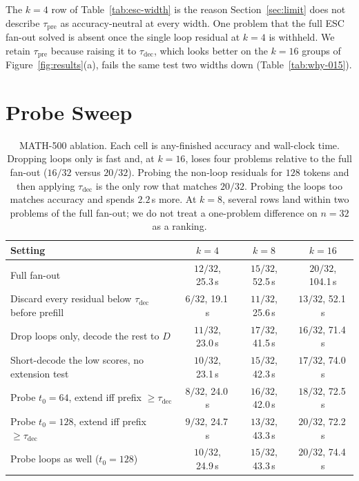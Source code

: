 The $k{=}4$ row of Table~\ref{tab:esc-width} is the reason Section~\ref{sec:limit} does not describe $\tau_{\mathrm{pre}}$ as accuracy-neutral at every width.
One problem that the full ESC fan-out solved is absent once the single loop residual at $k{=}4$ is withheld.
We retain $\tau_{\mathrm{pre}}$ because raising it to $\tau_{\mathrm{dec}}$, which looks better on the $k{=}16$ groups of Figure~\ref{fig:results}(a), fails the same test two widths down (Table~\ref{tab:why-015}).

\section{Probe Sweep}
\label{app:probe}

\begin{table}[t]
\centering
\small
\setlength{\tabcolsep}{6pt}
\begin{tabular}{@{}lccc@{}}
\toprule
Setting & $k{=}4$ & $k{=}8$ & $k{=}16$ \\
\midrule
Full fan-out & $12/32$, 25.3\,s & $15/32$, 52.5\,s & $20/32$, 104.1\,s \\
Discard every residual below $\tau_{\mathrm{dec}}$ before prefill & $6/32$, 19.1\,s & $11/32$, 25.6\,s & $13/32$, 52.1\,s \\
Drop loops only, decode the rest to $D$ & $11/32$, 23.0\,s & $17/32$, 41.5\,s & $16/32$, 71.4\,s \\
Short-decode the low scores, no extension test & $10/32$, 23.1\,s & $15/32$, 42.3\,s & $17/32$, 74.0\,s \\
Probe $t_0{=}64$, extend iff prefix $\ge \tau_{\mathrm{dec}}$ & $8/32$, 24.0\,s & $16/32$, 42.0\,s & $18/32$, 72.5\,s \\
Probe $t_0{=}128$, extend iff prefix $\ge \tau_{\mathrm{dec}}$ & $9/32$, 24.7\,s & $13/32$, 43.3\,s & $20/32$, 72.2\,s \\
Probe loops as well ($t_0{=}128$) & $10/32$, 24.9\,s & $15/32$, 43.3\,s & $20/32$, 74.4\,s \\
\bottomrule
\end{tabular}
\caption{MATH-500 ablation.
Each cell is any-finished accuracy and wall-clock time.
Dropping loops only is fast and, at $k{=}16$, loses four problems relative to the full fan-out ($16/32$ versus $20/32$).
Probing the non-loop residuals for $128$ tokens and then applying $\tau_{\mathrm{dec}}$ is the only row that matches $20/32$.
Probing the loops too matches accuracy and spends $2.2$\,s more.
At $k{=}8$, several rows land within two problems of the full fan-out; we do not treat a one-problem difference on $n{=}32$ as a ranking.}
\label{tab:probe-full}
\end{table}

